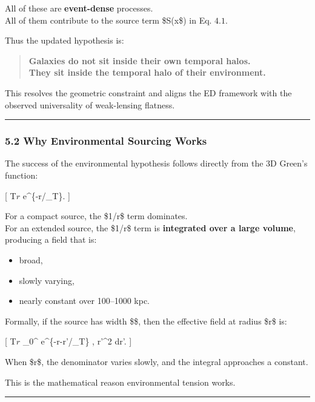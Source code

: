 All of these are \textbf{event-dense} processes.\\
All of them contribute to the source term \$S(x\$) in Eq. \(4.1\).

Thus the updated hypothesis is:

\begin{quote}
\textbf{Galaxies do not sit inside their own temporal halos.\\
They sit inside the temporal halo of their environment.}
\end{quote}

This resolves the geometric constraint and aligns the ED framework with
the observed universality of weak-lensing flatness.

\begin{center}\rule{0.5\linewidth}{0.5pt}\end{center}

\subsubsection{5.2 Why Environmental Sourcing
Works}\label{why-environmental-sourcing-works}

The success of the environmental hypothesis follows directly from the 3D
Green's function:

{[} T\(r\) \propto {} e\^{}\{-r/\ell\_T\}.  {]}

For a compact source, the \$1/r\$ term dominates.\\
For an extended source, the \$1/r\$ term is \textbf{integrated over a
large volume}, producing a field that is:

\begin{itemize}
\tightlist
\item
  broad,
\item
  slowly varying,
\item
  nearly constant over 100--1000 kpc.
\end{itemize}

Formally, if the source has width \$\sigma\$, then the effective field
at radius \$r\$ is:

{[} T\(r\) \approx \int\_0\^{}\sigma {}
e\^{}\{-\textbar r-r'\textbar/\ell\_T\} , r'\^{}2 dr'.  {]}

When \$\sigma \gg r\$, the denominator varies slowly, and the integral
approaches a constant.

This is the mathematical reason environmental tension works.

\begin{center}\rule{0.5\linewidth}{0.5pt}\end{center}

